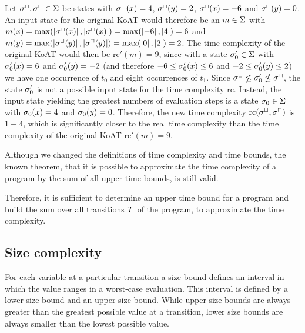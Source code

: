 Let ${\sigma^\sqcup}, {\sigma^\sqcap} \in \Sigma$ be states with ${\sigma^\sqcap}(x) = 4$, ${\sigma^\sqcap}(y) = 2$, ${\sigma^\sqcup}(x) = -6$ and ${\sigma^\sqcup}(y) = 0$.
An input state for the original KoAT would therefore be an $m \in \Sigma$ with $m(x) = \max(\left|{\sigma^\sqcup}(x)\right|, \left|{\sigma^\sqcap}(x)\right|) = \max(\left|-6\right|, \left|4\right|) = 6$ and $m(y) = \max(\left|{\sigma^\sqcup}(y)\right|, \left|{\sigma^\sqcap}(y)\right|) = \max(\left|0\right|, \left|2\right|) = 2$.
The time complexity of the original KoAT would then be $\text{rc}'(m) = 9$, since with a state $\sigma'_0 \in \Sigma$ with $\sigma'_0(x) = 6$ and $\sigma'_0(y) = -2$ (and therefore $-6 \leq \sigma'_0(x) \leq 6$ and $-2 \leq \sigma'_0(y) \leq 2$) we have one occurrence of $t_0$ and eight occurrences of $t_1$.
Since ${\sigma^\sqcup} \nleq \sigma'_0 \nleq {\sigma^\sqcap}$, the state $\sigma'_0$ is not a possible input state for the time complexity $\text{rc}$.
Instead, the input state yielding the greatest numbers of evaluation steps is a state $\sigma_0 \in \Sigma$ with $\sigma_0(x) = 4$ and $\sigma_0(y) = 0$.
Therefore, the new time complexity $\text{rc}({\sigma^\sqcup}, {\sigma^\sqcap})$ is $1 + 4$, which is significantly closer to the real time complexity than the time complexity of the original KoAT $\text{rc}'(m) = 9$.

Although we changed the definitions of time complexity and time bounds, the known theorem, that it is possible to approximate the time complexity of a program by the sum of all upper time bounds, is still valid.



Therefore, it is sufficient to determine an upper time bound for a program and build the sum over all transitions $\mathcal{T}$ of the program, to approximate the time complexity. 

\subsection{Size complexity}

For each variable at a particular transition a size bound defines an interval in which the value ranges in a worst-case evaluation.
This interval is defined by a lower size bound and an upper size bound.
While upper size bounds are always greater than the greatest possible value at a transition, lower size bounds are always smaller than the lowest possible value.

